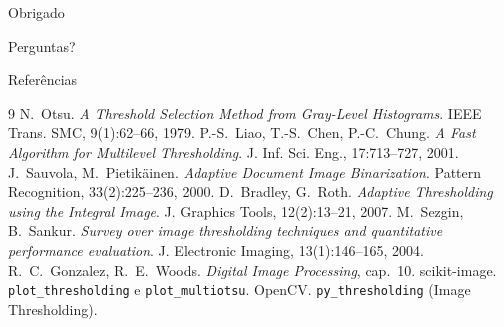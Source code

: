 \documentclass[aspectratio=169,12pt]{beamer}
\begin{document}
\begin{frame}[standout]
  Obrigado
  \vspace{.6em}

  {\small\normalfont Perguntas?}
\end{frame}

\begin{frame}[allowframebreaks]{Referências}

  \footnotesize
  \begin{thebibliography}{9}
      N.~Otsu. \emph{A Threshold Selection Method from Gray-Level Histograms}.
      IEEE Trans. SMC, 9(1):62--66, 1979.
      P.-S.~Liao, T.-S.~Chen, P.-C.~Chung. \emph{A Fast Algorithm for Multilevel
      Thresholding}. J. Inf. Sci. Eng., 17:713--727, 2001.
      J.~Sauvola, M.~Pietikäinen. \emph{Adaptive Document Image Binarization}.
      Pattern Recognition, 33(2):225--236, 2000.
      D.~Bradley, G.~Roth. \emph{Adaptive Thresholding using the Integral Image}.
      J. Graphics Tools, 12(2):13--21, 2007.
      M.~Sezgin, B.~Sankur. \emph{Survey over image thresholding techniques and
      quantitative performance evaluation}. J. Electronic Imaging,
      13(1):146--165, 2004.
      R.~C.~Gonzalez, R.~E.~Woods. \emph{Digital Image Processing}, cap.~10.
      scikit-image. \texttt{plot\_thresholding} e \texttt{plot\_multiotsu}.
      OpenCV. \texttt{py\_thresholding} (Image Thresholding).
  \end{thebibliography}

\end{frame}
\end{document}
